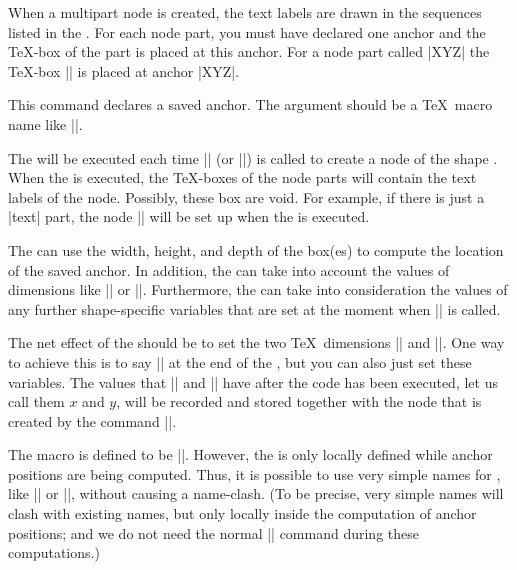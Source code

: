 \begin{command}{\pgfdeclareshape{}}
\begin{command}{\nodeparts{}}
        When a multipart node is created, the text labels are drawn in the
        sequences listed in the . For each node part,
        you must have declared one anchor and the \TeX-box of the part is
        placed at this anchor. For a node part called |XYZ| the \TeX-box
        |\pgfnodepartXYZbox| is placed at anchor |XYZ|.
    \end{command}

    \begin{command}{\savedanchor{}}
        This command declares a saved anchor. The argument 
        should be a \TeX\ macro name like |\centerpoint|.

        The  will be executed each time |\pgfnode| (or
        |\pgfmultipartnode|) is called to  create a node of the shape
        . When the  is executed, the \TeX-boxes of
        the node parts will contain the text labels of the node. Possibly,
        these box are void. For example, if there is just a |text| part, the
        node |\pgfnodeparttextbox| will be set up when the  is
        executed.

        The  can use the width, height, and depth of the box(es) to
        compute the location of the saved anchor. In addition, the 
        can take into account the values of dimensions like |\pgfshapeminwidth|
        or |\pgfshapeinnerxsep|. Furthermore, the  can take into
        consideration the values of any further shape-specific variables that
        are set at the moment when |\pgfnode| is called.

        The net effect of the  should be to set the two \TeX\
        dimensions |\pgf@x| and |\pgf@y|. One way to achieve this is to say
        |\pgfpoint{|\meta{x value}|}{|\meta{y value}|}| at the end of the
        \meta{code}, but you can also just set these variables. The values that
        |\pgf@x| and |\pgf@y| have after the code has been executed, let us
        call them $x$ and $y$, will be recorded and stored together with the
        node that is created by the command |\pgfnode|.

        The macro  is defined to be ||.
        However, the \meta{command} is only locally defined while anchor
        positions are being computed. Thus, it is possible to use very simple
        names for , like |\center| or |\a|, without causing a
        name-clash. (To be precise, very simple \meta{command} names will clash
        with existing names, but only locally inside the computation of anchor
        positions; and we do not need the normal |\center| command during these
        computations.)


\end{command}
\end{command}
